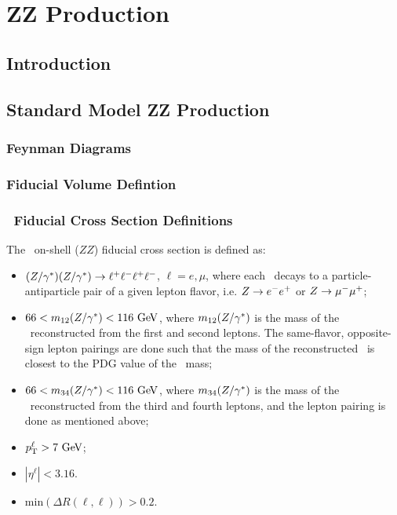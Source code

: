 \graphicspath{{Chapters/TheoryZZProduction/Figures/}}
\chapter{ZZ Production}
\label{chap:TheoryZZProduction}

\section{Introduction}
\section{Standard Model ZZ Production}
\subsection{Feynman Diagrams}
\subsection{Fiducial Volume Defintion}

\subsection{\zzllll\ Fiducial Cross Section Definitions}

The \zzllll\ on-shell ($ZZ$) fiducial cross section is defined as:
\begin{itemize}
\item{$(Z/\gamma^*)(Z/\gamma^*)\rightarrow\ell^+ \ell^-\ell^+ \ell^-$, $\ell = e,\mu$,
where each \Z\ decays to a particle-antiparticle pair of a given lepton flavor,
i.e. $Z\rightarrow e^{-}e^{+}$ or $Z\rightarrow \mu^{-}\mu^{+}$;}
\item{ $66 < m_{12}(\Z/\gamma^*) <  116\GeV$, where $m_{12}(Z/\gamma^*)$ is
the mass of the \Z\ reconstructed from the first and second leptons.  The
same-flavor, opposite-sign lepton pairings are done such that the mass of the 
reconstructed \Z\ is closest to the PDG value of the \Z\ mass;}
\item{ $66 < m_{34}(\Z/\gamma^*) <  116\GeV$, where $m_{34}(Z/\gamma^*)$ is
the mass of the \Z\ reconstructed from the third and fourth leptons, and the
lepton pairing is done as mentioned above;}
\item $\pT^{\ell} > 7\GeV$;
\item $|\eta^{\ell}| < 3.16$.
\item{$\mathrm{min}(\Delta R(\ell,\ell)) > 0.2$.}
\end{itemize}

